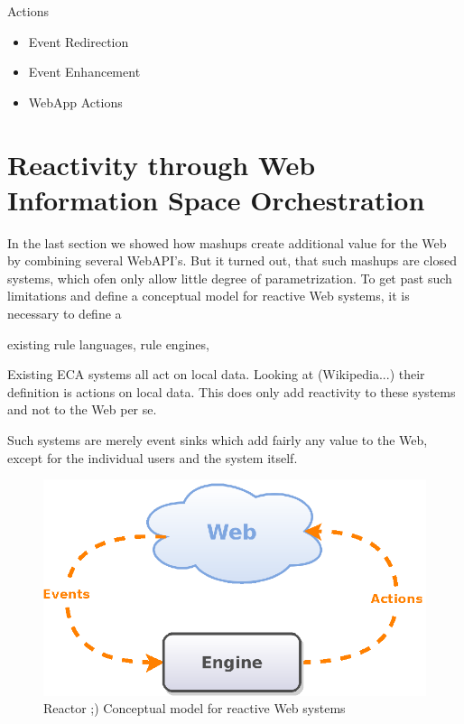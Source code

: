 Actions
\begin{itemize}
  \item Event Redirection
  \item Event Enhancement
  \item WebApp Actions
\end{itemize}


\section{Reactivity through Web Information Space Orchestration}


In the last section we showed how mashups create additional value for the Web by combining several WebAPI's.
But it turned out, that such mashups are closed systems, which ofen only allow little degree of parametrization.
To get past such limitations and define a conceptual model for reactive Web systems, it is necessary to define a 

existing rule languages, rule engines, 

Existing ECA systems all act on local data.
Looking at (Wikipedia...) their definition is actions on local data.
This does only add reactivity to these systems and not to the Web per se.

Such systems are merely event sinks which add fairly any value to the Web, except for the individual users and the system itself.

\begin{figure}[!ht]
  \centering
  \includegraphics{figures/Conceptual_Model_Simple}
  \caption{Reactor ;) Conceptual model for reactive Web systems}
  \label{fig:Conceptual_Model_Simple}
\end{figure}

